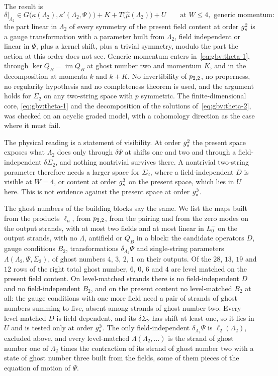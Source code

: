 The result is
\begin{equation}
  \label{eq:gbv:theta-result}
  \delta \big\vert_{\Lambda_2}
    \in G\big( \kappa(\Lambda_2), \kappa'(\Lambda_2, \Psi) \big)
      + K
      + T\big( \hat\mu(\Lambda_2) \big)
      + U
  \qquad
  \text{at } W \le 4,
  \text{ generic momentum}:
\end{equation}
the part linear in $\Lambda_2$ of every symmetry of the present field content at order $g_s^2$ is a gauge transformation with a parameter built from $\Lambda_2$, field independent or linear in $\Psi$, plus a kernel shift, plus a trivial symmetry, modulo the part the action at this order does not see.
Generic momentum enters in~\eqref{eq:gbv:theta-1}, through $\ker Q_B = \operatorname{im} Q_B$ at ghost number two and momentum $K$, and in the decomposition at momenta $k$ and $k + K$.
No invertibility of $p_{2,2}$, no properness, no regularity hypothesis and no completeness theorem is used, and the argument holds for $\Sigma_2$ on any two-string space with $p$ symmetric.
The finite-dimensional core, \eqref{eq:gbv:theta-1} and the decomposition of the solutions of~\eqref{eq:gbv:theta-2}, was checked on an acyclic graded model, with a cohomology direction as the case where it must fail.

The physical reading is a statement of visibility.
At order $g_s^2$ the present space exposes what $\Lambda_2$ does only through $\delta \Psi$ at shifts one and two and through a field-independent $\delta \Sigma_2$, and nothing nontrivial survives there.
A nontrivial two-string parameter therefore needs a larger space for $\Sigma_2$, where a field-independent $D$ is visible at $W = 4$, or content at order $g_s^3$ on the present space, which lies in $U$ here.
This is not evidence against the present space at order $g_s^3$.

The ghost numbers of the building blocks say the same.
We list the maps built from the products $\ell_n$, from $p_{2,2}$, from the pairing and from the zero modes on the output strands, with at most two fields and at most linear in $L_0^-$ on the output strands, with no $\Lambda$, antifield or $Q_B$ in a block: the candidate operators $D$, gauge conditions $B_2$, transformations $\delta_{\Lambda_2} \Psi$ and single-string parameters $\Lambda(\Lambda_2, \Psi, \Sigma_2)$, of ghost numbers $4$, $3$, $2$, $1$ on their outputs.
Of the $28$, $13$, $19$ and $12$ rows of the right total ghost number, $6$, $0$, $6$ and $4$ are level matched on the present field content.
On level-matched strands there is no field-independent $D$ and no field-independent $B_2$, and on the present content no level-matched $B_2$ at all: the gauge conditions with one more field need a pair of strands of ghost numbers summing to five, absent among strands of ghost number two.
Every level-matched $D$ is field dependent, and its $\delta \Sigma_2$ has shift at least one, so it lies in $U$ and is tested only at order $g_s^3$.
The only field-independent $\delta_{\Lambda_2} \Psi$ is $\ell_2(\Lambda_2)$, excluded above, and every level-matched $\Lambda(\Lambda_2, \dots)$ is the strand of ghost number one of $\Lambda_2$ times the contraction of its strand of ghost number two with a state of ghost number three built from the fields, some of them pieces of the equation of motion of $\Psi$.

